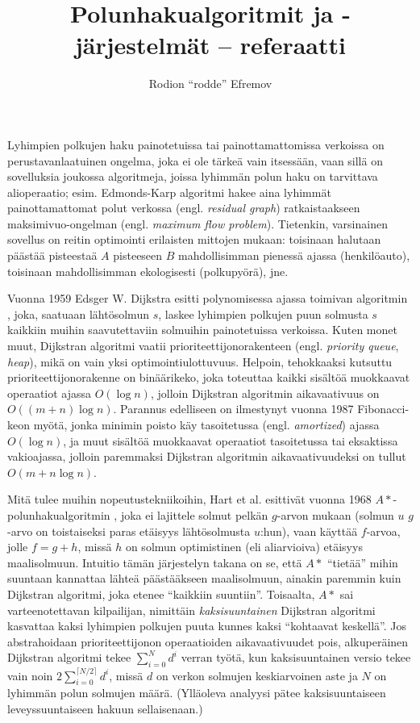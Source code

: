 \documentclass[12pt]{article}
\title{Polunhakualgoritmit ja -järjestelmät -- referaatti}
\author{Rodion ``rodde'' Efremov}
\begin{document}
 \maketitle
\noindent Lyhimpien polkujen haku painotetuissa tai painottamattomissa verkoissa on perustavanlaatuinen ongelma, joka ei ole tärkeä vain itsessään, vaan sillä on sovelluksia joukossa algoritmeja, joissa lyhimmän polun haku on tarvittava alioperaatio; esim. Edmonds-Karp algoritmi hakee aina lyhimmät painottamattomat polut verkossa (engl. \textit{residual graph}) ratkaistaakseen maksimivuo-ongelman (engl. \textit{maximum flow problem}). Tietenkin, varsinainen sovellus on reitin optimointi erilaisten mittojen mukaan: toisinaan halutaan päästää pisteestaä $A$ pisteeseen $B$ mahdollisimman pienessä ajassa (henkilöauto), toisinaan mahdollisimman ekologisesti (polkupyörä), jne.

Vuonna 1959 Edsger W. Dijkstra esitti polynomisessa ajassa toimivan algoritmin \cite{Dijkstra59}, joka, saatuaan lähtösolmun $s$, laskee lyhimpien polkujen puun solmusta $s$ kaikkiin muihin saavutettaviin solmuihin painotetuissa verkoissa. Kuten monet muut, Dijkstran algoritmi vaatii prioriteettijonorakenteen (engl. \textit{priority queue}, \textit{heap}), mikä on vain yksi optimointiulottuvuus. Helpoin, tehokkaaksi kutsuttu prioriteettijonorakenne on binäärikeko, joka toteuttaa kaikki sisältöä muokkaavat operaatiot ajassa $O(\log n)$, jolloin Dijkstran algoritmin aikavaativuus on $O((m + n) \log n)$. Parannus edelliseen on ilmestynyt vuonna 1987 Fibonacci-keon myötä, jonka minimin poisto käy tasoitetussa (engl. \textit{amortized}) ajassa $O(\log n)$, ja muut sisältöä muokkaavat operaatiot tasoitetussa tai eksaktissa vakioajassa, jolloin paremmaksi Dijkstran algoritmin aikavaativuudeksi on tullut $O(m + n\log n)$. 

Mitä tulee muihin nopeutustekniikoihin, Hart et al. esittivät vuonna 1968 $A\ast$-polun\-hakualgoritmin \cite{Hart68}, joka ei lajittele solmut pelkän $g$-arvon mukaan (solmun $u$ $g$-arvo on toistaiseksi paras etäisyys lähtösolmusta $u$:hun), vaan käyttää $f$-arvoa, jolle $f = g + h$, missä $h$ on solmun optimistinen (eli aliarvioiva) etäisyys maalisolmuun. Intuitio tämän järjestelyn takana on se, että $A\ast$ ``tietää'' mihin suuntaan kannattaa lähteä päästääkseen maalisolmuun, ainakin paremmin kuin Dijkstran algoritmi, joka etenee ``kaikkiin suuntiin''. Toisaalta, $A\ast$ sai varteenotettavan kilpailijan, nimittäin \textit{kaksisuuntainen} Dijkstran algoritmi kasvattaa kaksi lyhimpien polkujen puuta kunnes kaksi ``kohtaavat keskellä''. Jos abstrahoidaan prioriteettijonon operaatioiden aikavaativuudet pois, alkuperäinen Dijkstran algoritmi tekee $\sum_{i = 0}^N d^i$ verran työtä, kun kaksisuuntainen versio tekee vain noin $2\sum_{i=0}^{\lceil N / 2 \rceil}d^i$, missä $d$ on verkon solmujen keskiarvoinen aste ja $N$ on lyhimmän polun solmujen määrä. (Ylläoleva analyysi pätee kaksisuuntaiseen leveyssuuntaiseen hakuun sellaisenaan.)
\end{document}
